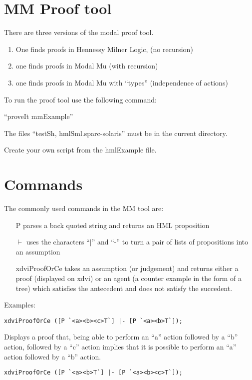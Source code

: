 \documentclass[12pt]{article}
\begin{document}
\section{MM Proof tool}
There are three versions of the modal proof tool.
\begin{enumerate}
\item One finds proofs in Hennessy Milner Logic, (no recursion)
\item one finds proofs in Modal Mu (with recursion)
\item one finds proofs in Modal Mu with ``types'' (independence of actions)
\end{enumerate}

To run the proof tool use the following command:

``proveIt mmExample''

The files ``testSh, hmlSml.sparc-solaris'' must be in the current directory.

Create your own script from the hmlExample file.




\section{Commands}
The commonly used commands in the MM tool are:

\begin{itemize}
\item[P] parses a back quoted string and returns an HML proposition
\item[$\vdash$] uses the characters ``$\mid$'' and ``-'' to 
      turn a pair of lists of propositions into an assumption
\item[xdviProofOrCe] takes an assumption (or judgement) and returns
     either a proof (displayed on xdvi) or an agent (a counter example
     in the form of a tree) which satisfies the antecedent
     and does not satisfy the succedent.
\end{itemize}

Examples:

\begin{verbatim}
xdviProofOrCe ([P `<a><b><c>T`] |- [P `<a><b>T`]);
\end{verbatim}

Displays a proof that, being able to perform an ``a'' action followed by
a ``b'' action, followed by a ``c'' action implies that it is possible to
perform an ``a'' action followed by a ``b'' action.

\begin{verbatim}
xdviProofOrCe ([P `<a><b>T`] |- [P `<a><b><c>T`]);
\end{verbatim}
\end{document}

